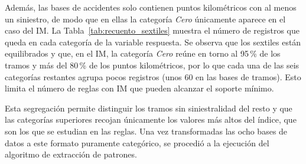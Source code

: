 \documentclass[twoside,a4paper,12pt,onecolumn,openany]{book}
\begin{document}
Además, las bases de accidentes solo contienen puntos kilométricos con al menos un siniestro, de modo que en ellas la categoría \textit{Cero} únicamente aparece en el caso del IM. La Tabla~\ref{tab:recuento_sextiles} muestra el número de registros que queda en cada categoría de la variable respuesta. Se observa que los sextiles están equilibrados y que, en el IM, la categoría \textit{Cero} reúne en torno al 95\,\% de los tramos y más del 80\,\% de los puntos kilométricos, por lo que cada una de las seis categorías restantes agrupa pocos registros (unos 60 en las bases de tramos). Esto limita el número de reglas con IM que pueden alcanzar el soporte mínimo.

\begin{table}[H]
\centering
\small
{}
\caption{Número de registros de cada categoría de la variable respuesta en las ocho bases de datos. El guion indica que la categoría no existe en esa base.}
\label{tab:recuento_sextiles}
\end{table}


Esta segregación permite distinguir los tramos sin siniestralidad del resto y que las categorías superiores recojan únicamente los valores más altos del índice, que son los que se estudian en las reglas. Una vez transformadas las ocho bases de datos a este formato puramente categórico, se procedió a la ejecución del algoritmo de extracción de patrones.
\end{document}
